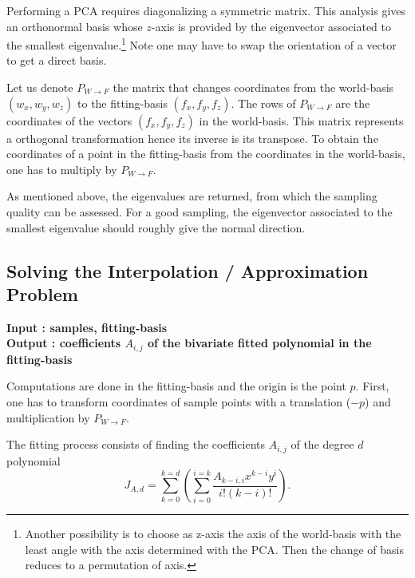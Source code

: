 \begin{ccAdvanced}
%
%
Performing a PCA requires diagonalizing a symmetric matrix.  This
analysis gives an orthonormal basis whose $z$-axis is provided by the
eigenvector associated to the smallest eigenvalue.\footnote{Another
  possibility is to choose as z-axis the axis of the world-basis with
  the least angle with the axis determined with the PCA. Then the
  change of basis reduces to a permutation of axis.} Note one may have
to swap the orientation of a vector to get a direct basis.

Let us denote $P_{W\rightarrow F}$ the matrix that changes coordinates from the
world-basis $(w_x,w_y,w_z)$ to the fitting-basis $(f_x,f_y,f_z)$. The
rows of $P_{W\rightarrow F}$ are the coordinates of the vectors
$(f_x,f_y,f_z)$ in the world-basis. This matrix represents a
orthogonal transformation hence its inverse is its transpose. To obtain
the coordinates of a point in the fitting-basis from the coordinates
in the world-basis, one has to multiply by $ P_{W\rightarrow F}$.

As mentioned above, the eigenvalues are returned, from which the
sampling quality can be assessed. For a good sampling, the eigenvector
associated to the smallest eigenvalue should roughly give the normal
direction.

\subsection{Solving the Interpolation / Approximation Problem}
\label{sec:solving}

{\bf Input : samples, fitting-basis \\ Output : coefficients $A_{i,j}$
of the bivariate fitted polynomial in the fitting-basis }

Computations are done in the fitting-basis and the origin is the point
$p$. First, one has to transform coordinates of sample points with a
translation ($-p$) and multiplication by $ P_{W\rightarrow F}$.

The fitting process consists of finding the coefficients
$A_{i,j}$ of the degree $d$ polynomial 
\begin{equation}
\label{eq-answer}
J_{A,d}= \sum_{k=0}^{k=d}(\sum_{i=0}^{i=k}
\frac{A_{k-i,i}x^{k-i}y^{i}}{i!(k-i)!}).
\end{equation}



\end{ccAdvanced}
